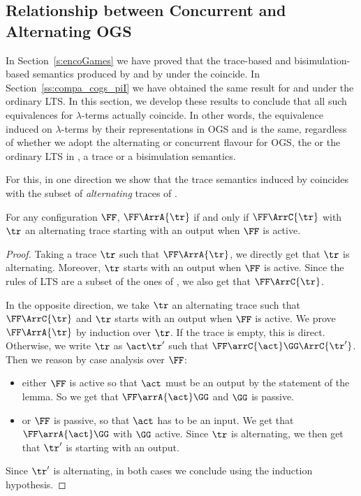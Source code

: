 \subsection{Relationship between Concurrent and Alternating OGS}
\label{subsec:relate-conc-alt-lts}


In Section~\ref{s:encoGames} we have proved that the
trace-based and bisimulation-based semantics produced by
\AOGS and by \piI under the \opLTS coincide. 
In Section~\ref{ss:compa_cogs_piI} we have obtained the
same result for \COGS and \piI under the ordinary LTS.
In this section, we develop these results to conclude that
all such equivalences for $\lambda$-terms actually coincide.  In other words, the equivalence
induced on $\lambda$-terms by their representations in OGS and \piI is
the same, regardless of whether we adopt the alternating or concurrent
flavour for OGS, the \opLTS or the ordinary LTS in \piI, a trace or a
bisimulation semantics.

For this, in one direction we show that the trace semantics induced by
\AOGS coincides with the subset of \emph{alternating} traces of \COGS.
 
\begin{lemma}
\label{l:traces_AOGS_COGS}
For any \AOGS configuration $\FF$, 
$\FF \ArrA{\tr}$ if and only if $\FF \ArrC{\tr}$ with $\tr$ an alternating
trace starting with an output when $\FF$ is active.
\end{lemma} 

\begin{proof}
Taking a trace $\tr$ such that $\FF \ArrA{\tr}$,
we directly get that $\tr$ is alternating.
Moreover, $\tr$ starts with an output when $\FF$ is active.
Since the rules of \AOGS LTS are a subset of the ones of \COGS,
we also get that $\FF \ArrC{\tr}$.

In the opposite direction, 
we take $\tr$ an alternating trace such that 
$\FF \ArrC{\tr}$ and $\tr$ starts 
with an output when $\FF$ is active.
We prove $\FF \ArrA{\tr}$ by induction over $\tr$.
If the trace is empty, this is direct.
Otherwise, we write $\tr$ as $\act \tr'$ such that
$\FF \arrC{\act} \GG \ArrC{\tr'}$.
Then we reason by case analysis over $\FF$:
\begin{itemize}
  \item either $\FF$ is active so that $\act$ must be an output by the statement
  of the lemma.
  So we get that $\FF \arrA{\act} \GG$ and $\GG$ is passive.
  \item or $\FF$ is passive, so that $\act$ has to be an input.
  We get that  $\FF \arrA{\act} \GG$ with $\GG$ active.
  Since $\tr$ is alternating, we then get that $\tr'$ is
  starting with an output. 
\end{itemize}
Since $\tr'$ is alternating,
in both cases we conclude using the induction hypothesis.
\end{proof}
 
